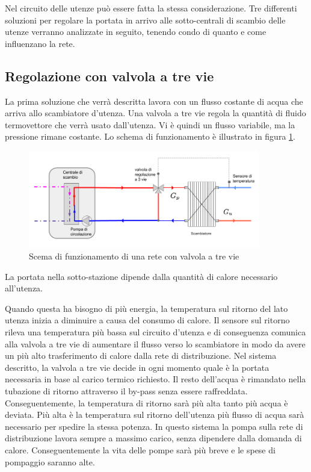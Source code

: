 \documentclass[laurea,oneside,11pt]{USiena_tesiLM}
\begin{document}
Nel circuito delle utenze può essere fatta la stessa considerazione. Tre differenti soluzioni per regolare la portata in arrivo alle sotto-centrali di scambio delle utenze verranno analizzate in seguito, tenendo condo di quanto e come influenzano la rete.

\subsection{Regolazione con valvola a tre vie}
\label{subsec:3vie}
La prima soluzione che verrà descritta lavora con un flusso costante di acqua che arriva allo scambiatore d'utenza. Una valvola a tre vie regola la quantità di fluido termovettore che verrà usato dall'utenza. Vi è quindi un flusso variabile, ma la pressione rimane costante. Lo schema di funzionamento è illustrato in figura \ref{fig:3vie}.

\begin{figure}[!ht]
\centering
\includegraphics[width=0.9\textwidth]{figure/3vie}
\caption{Scema di funzionamento di una rete con valvola a tre vie}
\label{fig:3vie}

\end{figure}


La portata nella sotto-stazione dipende dalla quantità di calore necessario all'utenza. 

Quando questa ha bisogno di più energia, la temperatura sul ritorno del lato utenza inizia a diminuire a causa del consumo di calore. Il sensore sul ritorno rileva una temperatura più bassa sul circuito d'utenza e di conseguenza comunica alla valvola a tre vie di aumentare il flusso verso lo scambiatore in modo da avere un più alto trasferimento di calore dalla rete di distribuzione.
Nel sistema descritto, la valvola a tre vie decide in ogni momento quale è la portata necessaria in base al carico termico richiesto. Il resto dell'acqua è rimandato nella tubazione di ritorno attraverso il by-pass senza essere raffreddata. Conseguentemente, la temperatura di ritorno sarà più alta tanto più acqua è deviata. Più alta è la temperatura sul ritorno dell'utenza     più flusso di acqua sarà necessario per spedire la stessa potenza. In questo sistema la pompa sulla rete di distribuzione lavora sempre a massimo carico, senza dipendere dalla domanda di calore. Conseguentemente la vita delle pompe sarà più breve e le spese di pompaggio saranno alte.
\end{document}
